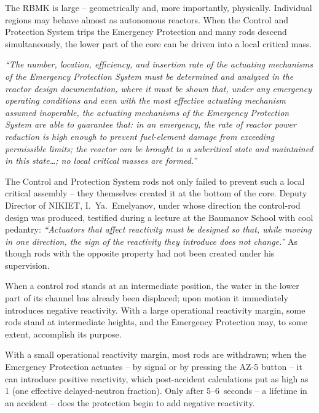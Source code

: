 \documentclass[openright]{bookest}
\begin{document}
The RBMK is large -- geometrically and, more importantly, physically. Individual regions may behave almost as autonomous reactors. When the Control and Protection System trips the Emergency Protection and many rods descend simultaneously, the lower part of the core can be driven into a local critical mass.

\begin{personal}
\textit{``The number, location, efficiency, and insertion rate of the actuating mechanisms of the Emergency Protection System must be determined and analyzed in the reactor design documentation, where it must be shown that, under any emergency operating conditions and even with the most effective actuating mechanism assumed inoperable, the actuating mechanisms of the Emergency Protection System are able to guarantee that: in an emergency, the rate of reactor power reduction is high enough to prevent fuel-element damage from exceeding permissible limits; the reactor can be brought to a subcritical state and maintained in this state\ldots{}; no local critical masses are formed.''}
\end{personal}

The Control and Protection System rods not only failed to prevent such a local critical assembly -- they themselves created it at the bottom of the core. Deputy Director of NIKIET, I.~Ya.~Emelyanov, under whose direction the control-rod design was produced, testified during a lecture at the Baumanov School with cool pedantry: \textit{``Actuators that affect reactivity must be designed so that, while moving in one direction, the sign of the reactivity they introduce does not change.''} As though rods with the opposite property had not been created under his supervision.

When a control rod stands at an intermediate position, the water in the lower part of its channel has already been displaced; upon motion it immediately introduces negative reactivity. With a large operational reactivity margin, some rods stand at intermediate heights, and the Emergency Protection may, to some extent, accomplish its purpose.

With a small operational reactivity margin, most rods are withdrawn; when the Emergency Protection actuates -- by signal or by pressing the AZ-5 button -- it can introduce positive reactivity, which post-accident calculations put as high as \qty{+1}{\beta} (one effective delayed-neutron fraction). Only after \numrange{5}{6}~seconds -- a lifetime in an accident -- does the protection begin to add negative reactivity.
\end{document}
